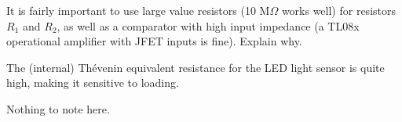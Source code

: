 

It is fairly important to use large value resistors (10 M$\Omega$ works well) for resistors $R_1$ and $R_2$, as well as a comparator with high input impedance (a TL08x operational amplifier with JFET inputs is fine).  Explain why.







The (internal) Th\'evenin equivalent resistance for the LED light sensor is quite high, making it sensitive to loading.







Nothing to note here.



